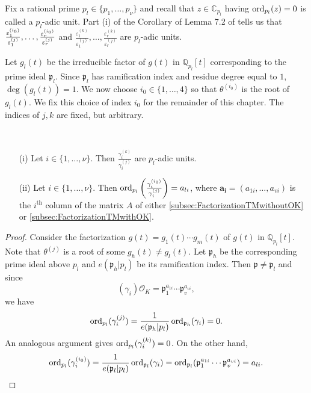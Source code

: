 Fix a rational prime $p_l \in \{p_1, \dots, p_{\nu}\}$ and recall that $z \in \mathbb{C}_{p_l}$ having $\operatorname{ord}_{p_l}(z) = 0$ is called a $p_l$-adic unit. Part (i) of the Corollary of Lemma 7.2 of  \cite{TW3} tells us that $\frac{\varepsilon_1^{(i_0)}}{\varepsilon_1^{(j)}}, \dots, \frac{\varepsilon_r^{(i_0)}}{\varepsilon_r^{(j)}}$ and $\frac{\varepsilon_1^{(k)}}{\varepsilon_1^{(j)}}, \dots, \frac{\varepsilon_r^{(k)}}{\varepsilon_r^{(j)}}$ are $p_l$-adic units. 

Let $g_l(t)$ be the irreducible factor of $g(t)$ in $\mathbb{Q}_{p_l}[t]$ corresponding to the prime ideal $\mathfrak{p}_l$. Since $\mathfrak{p}_l$ has ramification index and residue degree equal to $1$, $\deg(g_l(t)) = 1$. We now choose $i_0 \in \{1, \dots, 4\}$ so that $\theta^{(i_0)}$ is the root of $g_l(t)$. We fix this choice of index $i_0$ for the remainder of this chapter. The indices of $j,k$ are fixed, but arbitrary. 

\begin{lemma} \label{lem:SunitUnits} \
\begin{enumerate}
\item[(i)] Let $i \in \{1, \dots, \nu\}$. Then $\frac{\gamma_i^{(k)}}{\gamma_i^{(j)}}$ are $p_l$-adic units. 
\item[(ii)] Let $i \in \{1, \dots, \nu\}$. Then $\operatorname{ord}_{p_l}\left(\frac{\gamma_i^{(i_0)}}{\gamma_i^{(j)}}\right) = a_{li}$, where $\mathbf{a_i} = (a_{1i}, \dots, a_{vi})$ is the $i^{\text{th}}$ column of the matrix $A$ of either \autoref{subsec:FactorizationTMwithoutOK} or \autoref{subsec:FactorizationTMwithOK}. 
\end{enumerate}
\end{lemma}

\begin{proof}
Consider the factorization $g(t) = g_1(t) \cdots g_m(t)$ of $g(t)$ in $\mathbb{Q}_{p_l}[t]$. Note that $\theta^{(j)}$ is a root of some $g_h(t) \neq g_l(t)$. Let $\mathfrak{p}_h$ be the corresponding prime ideal above $p_l$ and $e(\mathfrak{p}_h|p_l)$ be its ramification index. Then $\mathfrak{p} \neq \mathfrak{p}_l$ and since 
\[(\gamma_i)\mathcal{O}_K = \mathfrak{p}_1^{a_{1i}} \cdots \mathfrak{p}_v^{a_{vi}},\]
we have 
\[\operatorname{ord}_{p_l}(\gamma_i^{(j)}) = \frac{1}{e(\mathfrak{p}_h|p_l)}\operatorname{ord}_{\mathfrak{p}_h}(\gamma_i) = 0.\]
An analogous argument gives $\operatorname{ord}_{p_l}(\gamma_i^{(k)}) = 0$. On the other hand, 
\[\operatorname{ord}_{p_l}(\gamma_i^{(i_0)}) = \frac{1}{e(\mathfrak{p}_l|p_l)}\operatorname{ord}_{\mathfrak{p}_l}(\gamma_i) = \operatorname{ord}_{\mathfrak{p}_l}(\mathfrak{p}_1^{a_{1i}} \cdots \mathfrak{p}_v^{a_{vi}}) = a_{li}.\]
\end{proof}


